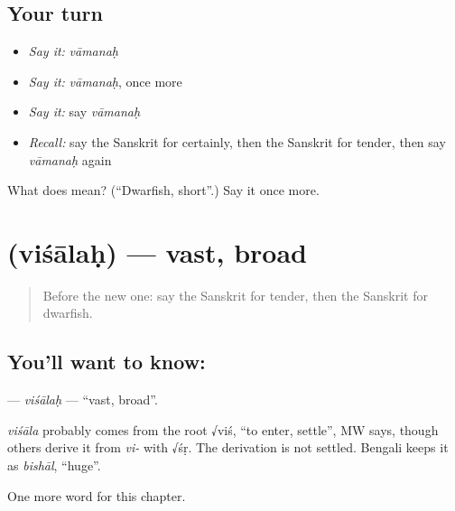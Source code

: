 \subsection*{Your turn}
\begin{itemize}
\raggedright
  \item \emph{Say it:} \emph{vāmanaḥ}
  \item \emph{Say it:} \emph{vāmanaḥ}, once more
  \item \emph{Say it:} say \emph{vāmanaḥ}
  \item \emph{Recall:} say the Sanskrit for certainly, then the Sanskrit for tender, then say \emph{vāmanaḥ} again
\end{itemize}

\begin{tcolorbox}[breakable,colback=teal!4,colframe=teal!35!black,title={Before you move on}]
What does  mean? (\textquotedblleft{}Dwarfish, short\textquotedblright{}.) Say it once more.
\end{tcolorbox}
\section[\texorpdfstring{\sk{विशालः} (viśālaḥ)}{विशालः (viśālaḥ)}]{ (viśālaḥ) — vast, broad}

\label{lesson:SA-C186-visalah}



\begin{quote}
Before the new one: say the Sanskrit for tender, then the Sanskrit for dwarfish.
\end{quote}

\subsection*{You'll want to know: }
\textbf{} — \emph{viśālaḥ} — \textquotedblleft{}vast, broad\textquotedblright{}.

\begin{cousinweb}
\emph{viśāla} probably comes from the root √viś, \textquotedblleft{}to enter, settle\textquotedblright{}, MW says, though others derive it from \emph{vi-} with √śṛ. The derivation is not settled. Bengali keeps it as \emph{bishāl}, \textquotedblleft{}huge\textquotedblright{}.
\end{cousinweb}

\begin{grammarlens}[title={What you've built}]
One more word for this chapter.
\end{grammarlens}

